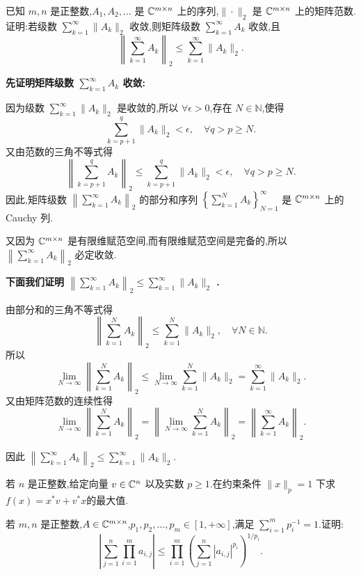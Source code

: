 \begin{problem}
已知 $m,n$ 是正整数,$A_1,A_2,\dots$ 是 $\mathbb{C}^{m\times n}$ 上的序列,$\|\cdot\|_2$ 是 $\mathbb{C}^{m\times n}$ 上的矩阵范数.证明:若级数 $\sum_{k=1}^{\infty}\|A_k\|_2$ 收敛,则矩阵级数 $\sum_{k=1}^{\infty}A_k$ 收敛,且
\[
    \left\|\sum_{k=1}^{\infty}A_k\right\|_2 \le \sum_{k=1}^{\infty}\|A_k\|_2.
\]
\begin{solution}
    \textbf{先证明矩阵级数 $\sum_{k=1}^{\infty}A_k$ 收敛:}

    因为级数 $\sum_{k=1}^{\infty}\|A_k\|_2$ 是收敛的,所以 $\forall \epsilon > 0$,存在 $N \in \mathbb{N}$,使得
    \[
        \sum_{k=p+1}^{q}\|A_k\|_2 < \epsilon, \quad \forall q > p \ge N.
    \]
    又由范数的三角不等式得
    \[
        \left\|\sum_{k=p+1}^{q}A_k\right\|_2 \le \sum_{k=p+1}^{q}\|A_k\|_2 < \epsilon, \quad \forall q > p \ge N.
    \]
    因此,矩阵级数 $\left\|\sum_{k=1}^{\infty}A_k\right\|_2$ 的部分和序列 $\left\{\sum_{k=1}^{N}A_k\right\}_{N=1}^{\infty}$ 是 $\mathbb{C}^{m \times n}$ 上的 Cauchy 列.

    又因为 $\mathbb{C}^{m \times n}$ 是有限维赋范空间,而有限维赋范空间是完备的,所以 $\left\|\sum_{k=1}^{\infty}A_k\right\|_2$ 必定收敛.

    \textbf{下面我们证明 $\left\|\sum_{k=1}^{\infty}A_k\right\|_2 \le \sum_{k=1}^{\infty}\|A_k\|_2$ .}

    由部分和的三角不等式得
    \[
        \left\|\sum_{k=1}^{N}A_k\right\|_2 \le \sum_{k=1}^{N}\|A_k\|_2, \quad \forall N \in \mathbb{N}.
    \]
    所以
    \[
        \lim_{N \to \infty} \left\|\sum_{k=1}^{N}A_k\right\|_2 \le \lim_{N \to \infty} \sum_{k=1}^{N}\|A_k\|_2 = \sum_{k = 1}^{\infty}\|A_k\|_2.
    \]
    又由矩阵范数的连续性得
    \[
        \lim_{N \to \infty} \left\|\sum_{k=1}^{N}A_k\right\|_2 = \left\| \lim_{N \to \infty}\sum_{k=1}^{N}A_k\right\|_2 = \left\|\sum_{k=1}^{\infty}A_k\right\|_2.
    \]
    
    因此 $\left\|\sum_{k=1}^{\infty}A_k\right\|_2 \le \sum_{k=1}^{\infty}\|A_k\|_2$.
\end{solution}
\end{problem}

\begin{problem}[选做]
若 $n$ 是正整数,给定向量 $v\in\mathbb{C}^n$ 以及实数 $p\ge 1$.在约束条件 $\|x\|_p=1$ 下求$f(x)=x^*v+v^*x$的最大值.
\begin{solution}
    
\end{solution}
\end{problem}

\begin{problem}[选做]
若 $m,n$ 是正整数,$A\in\mathbb{C}^{m\times n}$,$p_1,p_2,\dots,p_m\in[1,+\infty]$,满足 $\sum_{i=1}^{m}p_i^{-1}=1$.证明:
\[
    \left|\sum_{j=1}^{n}\prod_{i=1}^{m}a_{i,j}\right|
    \le
    \prod_{i=1}^{m}\left(\sum_{j=1}^{n}|a_{i,j}|^{p_i}\right)^{1/p_i}.
\]
\begin{solution}
    
\end{solution}
\end{problem}

